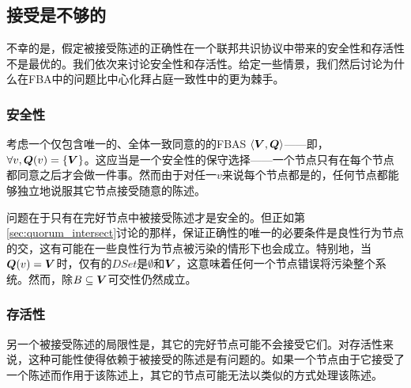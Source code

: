 \subsection{接受是不够的}
不幸的是，假定被接受陈述的正确性在一个联邦共识协议中带来的安全性和存活性不是最优的。我们依次来讨论安全性和存活性。给定一些情景，我们然后讨论为什么在FBA中的问题比中心化拜占庭一致性中的更为棘手。

\subsubsection{安全性}\label{sec:voting_safety}
考虑一个仅包含唯一的、全体一致同意的{\quorum}的FBAS $\langle{\bm V},{\bm Q}\rangle$——即，$\forall v, {\bm Q}(v)=\left\{{\bm V}\right\}$。这应当是一个安全性的保守选择——一个节点只有在每个节点都同意之后才会做一件事。然而由于对任一$v$来说每个节点都是{\vblock}的，任何节点都能够独立地说服其它节点接受随意的陈述。

问题在于只有在完好节点中被接受陈述才是安全的。但正如第\ref{sec:quorum_intersect}讨论的那样，保证正确性的唯一的必要条件是良性行为节点的{\quorum}交，这有可能在一些良性行为节点被污染的情形下也会成立。特别地，当${\bm Q}(v)={\bm V}$时，仅有的$DSet$是$\emptyset$和${\bm V}$，这意味着任何一个节点错误将污染整个系统。然而，除$B\subseteq{\bm V}${\quorum}可交性仍然成立。

\subsubsection{存活性}\label{sec:accept_not_enough_liveness}
另一个被接受陈述的局限性是，其它的完好节点可能不会接受它们。对存活性来说，这种可能性使得依赖于被接受的陈述是有问题的。如果一个节点由于它接受了一个陈述而作用于该陈述上，其它的节点可能无法以类似的方式处理该陈述。

